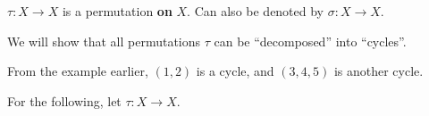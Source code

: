 
\begin{notation}
	\( \tau : X \to X \) is a permutation \textbf{on} \( X \). Can also be denoted by \( \sigma : X \to X \).
\end{notation}

We will show that all permutations \( \tau  \) can be ``decomposed'' into ``cycles''.

\begin{eg}
	From the example earlier, \( (1,2) \) is a cycle, and \( (3,4,5) \) is another cycle.
\end{eg}

For the following, let \( \tau : X \to X \).

\begin{definition}
	
\end{definition}
